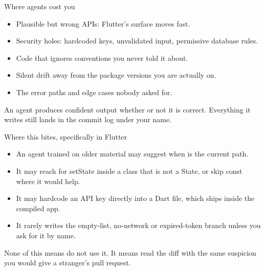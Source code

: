 \documentclass[10pt,aspectratio=169,t]{beamer}
\begin{document}
\begin{frame}[eyebrow=Agents]{Where agents cost you}
  \vskip 2mm
  \begin{itemize}
    \item Plausible but wrong APIs: Flutter's surface moves fast.
    \item Security holes: hardcoded keys, unvalidated input, permissive database rules.
    \item Code that ignores conventions you never told it about.
    \item Silent drift away from the package versions you are actually on.
    \item The error paths and edge cases nobody asked for.
  \end{itemize}
  \begin{takeaway}{An agent produces confident output whether or not it is correct.}
    Everything it writes still lands in the commit log under your name.
  \end{takeaway}
\end{frame}

\begin{frame}[eyebrow=Agents]{Where this bites, specifically in Flutter}
  \vskip 2mm
  \begin{itemize}
    \item An agent trained on older material may suggest  when  is the current path. 
    \item It may reach for setState inside a class that is not a State, or skip const where it would help.
    \item It may hardcode an API key directly into a Dart file, which ships inside the compiled app. 
    \item It rarely writes the empty-list, no-network or expired-token branch unless you ask for it by name.
  \end{itemize}
  \begin{takeaway}{None of this means do not use it.}
    It means read the diff with the same suspicion you would give a stranger's pull request.
  \end{takeaway}
\end{frame}
\end{document}
